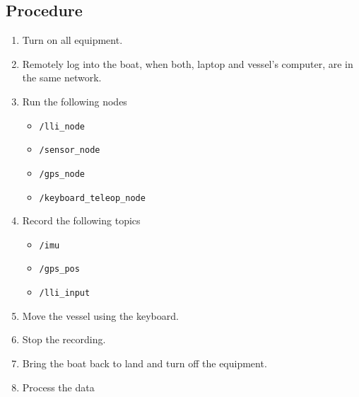 \subsection*{Procedure}
\begin{enumerate}
	\item Turn on all equipment.
    \item Remotely log into the boat, when both, laptop and vessel's computer, are in the same network.
	\item Run the following nodes
		\begin{itemize}
			\item \lstinline[style=cinline]{/lli_node}
            \item \lstinline[style=cinline]{/sensor_node}
            \item \lstinline[style=cinline]{/gps_node}
			\item \lstinline[style=cinline]{/keyboard_teleop_node}
		\end{itemize}
    \item Record the following topics
        \begin{itemize}
            \item \lstinline[style=cinline]{/imu}
            \item \lstinline[style=cinline]{/gps_pos}
            \item \lstinline[style=cinline]{/lli_input}        
        \end{itemize}
	\item Move the vessel using the keyboard.
	\item Stop the recording.
    \item Bring the boat back to land and turn off the equipment.
    \item Process the data
\end{enumerate}


